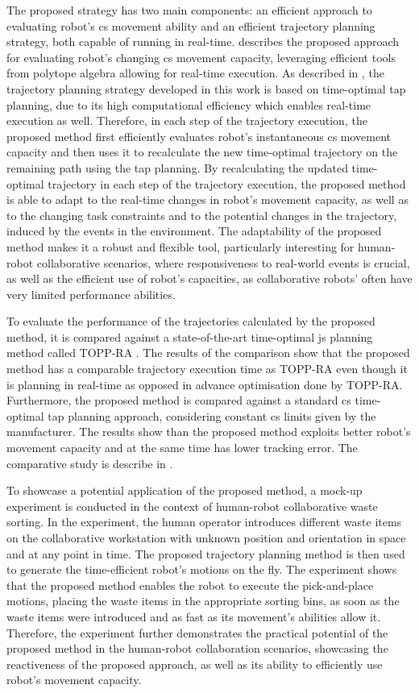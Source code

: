 The proposed strategy has two main components: an efficient approach to evaluating robot's \gls{cs} movement ability and an efficient trajectory planning strategy, both capable of running in real-time.  describes the proposed approach for evaluating robot's changing \gls{cs} movement capacity, leveraging efficient tools from polytope algebra allowing for real-time execution. As described in , the trajectory planning strategy developed in this work is based on time-optimal \gls{tap} planning, due to its high computational efficiency which enables real-time execution as well. Therefore, in each step of the trajectory execution, the proposed method first efficiently evaluates robot's instantaneous \gls{cs} movement capacity and then uses it to recalculate the new time-optimal trajectory on the remaining path using the \gls{tap} planning. 
By recalculating the updated time-optimal trajectory in each step of the trajectory execution, the proposed method is able to adapt to the real-time changes in robot's movement capacity, as well as to the changing task constraints and to the potential changes in the trajectory, induced by the events in the environment. 
The adaptability of the proposed method makes it a robust and flexible tool, particularly interesting for human-robot collaborative scenarios, where responsiveness to real-world events is crucial, as well as the efficient use of robot's capacities, as collaborative robots' often have very limited performance abilities. 

To evaluate the performance of the trajectories calculated by the proposed method, it is compared against a state-of-the-art time-optimal \gls{js} planning method called TOPP-RA \cite{Pham2018}. The results of the comparison show that the proposed method has a comparable trajectory execution time as TOPP-RA even though it is planning in real-time as opposed in advance optimisation done by TOPP-RA.
Furthermore, the proposed method is compared against a standard \gls{cs} time-optimal \gls{tap} planning approach, considering constant \gls{cs} limits given by the manufacturer. The results show than the proposed method exploits better robot's movement capacity and at the same time has lower tracking error. The comparative study is describe in .

To showcase a potential application of the proposed method, a mock-up experiment is conducted in the context of human-robot collaborative waste sorting. In the experiment, the human operator introduces different waste items on the collaborative workstation with unknown position and orientation in space and at any point in time. The proposed trajectory planning method is then used to generate the time-efficient robot's motions on the fly. The experiment shows that the proposed method enables the robot to execute the pick-and-place motions, placing the waste items in the appropriate sorting bins, as soon as the waste items were introduced and as fast as its movement's abilities allow it. Therefore, the experiment further demonstrates the practical potential of the proposed method in the human-robot collaboration scenarios, showcasing the reactiveness of the proposed approach, as well as its ability to efficiently use robot's movement capacity. 

